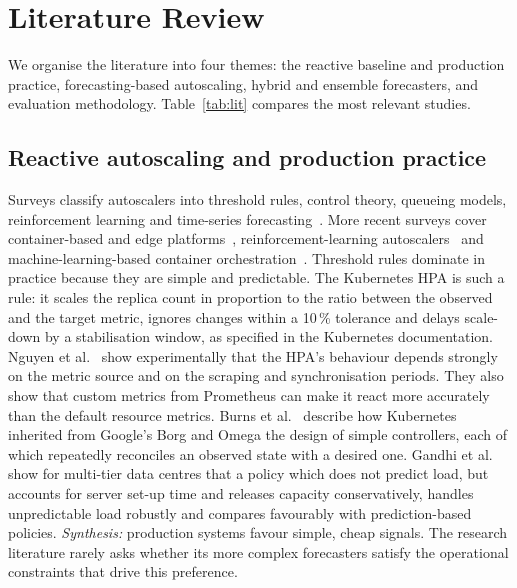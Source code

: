 \documentclass[conference,a4paper]{IEEEtran}
\begin{document}
\section{Literature Review}\label{sec:lit}
We organise the literature into four themes: the reactive baseline and production practice, forecasting-based
autoscaling, hybrid and ensemble forecasters, and evaluation methodology. Table~\ref{tab:lit} compares the most
relevant studies.

\subsection{Reactive autoscaling and production practice}
Surveys classify autoscalers into threshold rules, control theory, queueing models, reinforcement learning and
time-series forecasting~\cite{lorido2014,qu2018,aldhuraibi2018}. More recent surveys cover container-based and
edge platforms~\cite{dogani2023}, reinforcement-learning autoscalers~\cite{gari2021} and machine-learning-based
container orchestration~\cite{zhong2022}. Threshold rules dominate in practice because they are simple and
predictable. The Kubernetes HPA is such a rule: it scales the replica count in proportion to the ratio between
the observed and the target metric, ignores changes within a 10\,\% tolerance and delays scale-down by a
stabilisation window, as specified in the Kubernetes documentation. Nguyen et al.~\cite{nguyen2020} show experimentally that the HPA's behaviour
depends strongly on the metric source and on the scraping and synchronisation periods. They also show that custom
metrics from Prometheus can make it react more accurately than the default resource metrics. Burns et
al.~\cite{burns2016} describe how Kubernetes inherited from Google's Borg and Omega the design of simple controllers,
each of which repeatedly reconciles an observed state with a desired one. Gandhi et al.~\cite{gandhi2012} show for
multi-tier data centres that a policy which does not predict load, but accounts for server set-up time and
releases capacity conservatively, handles unpredictable load robustly and compares favourably with
prediction-based policies. \emph{Synthesis:} production systems
favour simple, cheap signals. The research literature rarely asks whether its more complex forecasters satisfy
the operational constraints that drive this preference.
\end{document}
